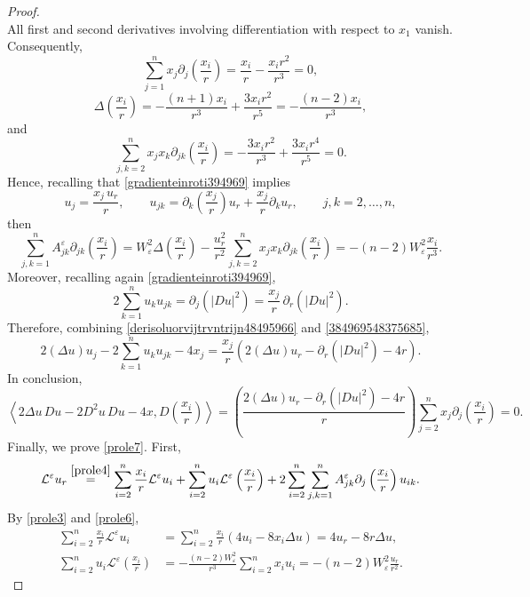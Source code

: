 \documentclass[11pt]{amsart}
\newcommand{\eps}{\varepsilon}
\newcommand{\We}{W_\eps}
\newcommand{\Le}{\mathcal L^\eps}
\newcommand{\Ae}{A^\eps}
\theoremstyle{definition}
\theoremstyle{remark}
\numberwithin{equation}{section}
\begin{document}
\begin{proof}
\[\]
All first and second derivatives involving differentiation
with respect to $x_1$ vanish. Consequently,
\[
\sum_{j=1}^n
x_j\partial_j\left(\frac{x_i}{r}\right)
=
\frac{x_i}{r}-\frac{x_i r^2}{r^3}
=0,
\]
\[
\Delta\left(\frac{x_i}{r}\right)
=
-\frac{(n+1)x_i}{r^3}
+\frac{3x_i r^2}{r^5}
=
-\frac{(n-2)x_i}{r^3},
\]
and
\[
\sum_{j,k=2}^n
x_j x_k\partial_{jk}\left(\frac{x_i}{r}\right)
=
-\frac{3x_i r^2}{r^3}
+\frac{3x_i r^4}{r^5}
=0.
\]
Hence, recalling that \eqref{gradienteinroti394969} implies
\begin{equation}\label{derisoluorvijtrvntrijn48495966}
    u_j=\frac{x_j\,u_r}{r},
\qquad u_{jk}=\partial_k\left(\frac{x_j}{r}\right)u_r+\frac{x_j}{r}\partial _k u_r,\qquad  j,k=2,\ldots,n ,
\end{equation}
then
\begin{equation*}
\sum_{j,k=1}^n
\Ae_{jk}
\partial_{jk}\left(\frac{x_i}{r}\right)
=
\We^2\Delta\left(\frac{x_i}{r}\right)
-\frac{u_r^2}{r^2}
\sum_{j,k=2}^n
x_j x_k
\partial_{jk}\left(\frac{x_i}{r}\right)=-(n-2)W_\varepsilon^2\frac{x_i}{r^3}.
\end{equation*}
Moreover, recalling again \eqref{gradienteinroti394969},
\begin{equation}\label{384969548375685}
2\sum_{k=1}^n u_k u_{jk}
=\partial_j(|Du|^2)
=\frac{x_j}{r}\,\partial_r(|Du|^2).
\end{equation}
Therefore, combining \eqref{derisoluorvijtrvntrijn48495966} and \eqref{384969548375685},
\[
2(\Delta u)u_j
-2\sum_{k=1}^n u_k u_{jk}
-4x_j
=
\frac{x_j}{r}
\left(
2(\Delta u)u_r-\partial_r(|Du|^2)-4r
\right).
\]
In conclusion,
\[
\left\langle 2\Delta u\,Du-2D^2 u\,Du-4x,D\left(\frac{x_i}{r}\right)\right\rangle=
\left(\frac{2(\Delta u)u_r-\partial_r(|Du|^2)-4r}{r}
\right)\sum_{j=2}^n
x_j\partial_j\left(\frac{x_i}{r}\right)
=0.
\]
Finally, we prove \eqref{prole7}. First,
\begin{equation*}
\Le u_r\overset{\eqref{prole4}}{=}
\sum_{i=2}^n\frac{x_i}{r}\Le u_i
+\sum_{i=2}^n u_i\Le\left(\frac{x_i}{r}\right)
+
2\sum_{i=2}^n\sum_{j,k=1}^n
\Ae_{jk}
\partial_j\left(\frac{x_i}{r}\right)u_{ik}.
\end{equation*}
By \eqref{prole3} and \eqref{prole6},
\begin{align*}
\sum_{i=2}^n\frac{x_i}{r}\Le u_i
&=
\sum_{i=2}^n\frac{x_i}{r}
\left(4u_i-8x_i\Delta u\right)
=4u_r-8r\Delta u,\\
\sum_{i=2}^n u_i\Le\left(\frac{x_i}{r}\right)
&=
-\frac{(n-2)W_\varepsilon^2}{r^3}
\sum_{i=2}^n x_i u_i
=-(n-2)W_\varepsilon^2\frac{u_r}{r^2}.
\end{align*}

\end{proof}
\end{document}
